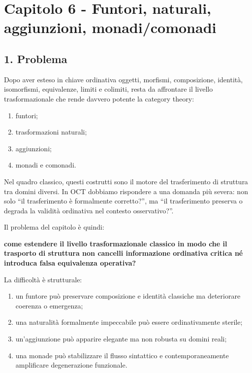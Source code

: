 \chapter{Capitolo 6 - Funtori, naturali, aggiunzioni, monadi/comonadi}

\section{1. Problema}

Dopo aver esteso in chiave ordinativa oggetti, morfismi, composizione, identità, isomorfismi, equivalenze, limiti e colimiti, resta da affrontare il livello trasformazionale che rende davvero potente la category theory:

\begin{enumerate}
\def\labelenumi{\arabic{enumi}.}
\tightlist
\item
  funtori;
\item
  trasformazioni naturali;
\item
  aggiunzioni;
\item
  monadi e comonadi.
\end{enumerate}

Nel quadro classico, questi costrutti sono il motore del trasferimento di struttura tra domini diversi. In OCT dobbiamo rispondere a una domanda più severa: non solo ``il trasferimento è formalmente corretto?'', ma ``il trasferimento preserva o degrada la validità ordinativa nel contesto osservativo?''.

Il problema del capitolo è quindi:

\textbf{come estendere il livello trasformazionale classico in modo che il trasporto di struttura non cancelli informazione ordinativa critica né introduca falsa equivalenza operativa?}

La difficoltà è strutturale:

\begin{enumerate}
\def\labelenumi{\arabic{enumi}.}
\tightlist
\item
  un funtore può preservare composizione e identità classiche ma deteriorare coerenza o emergenza;
\item
  una naturalità formalmente impeccabile può essere ordinativamente sterile;
\item
  un'aggiunzione può apparire elegante ma non robusta su domini reali;
\item
  una monade può stabilizzare il flusso sintattico e contemporaneamente amplificare degenerazione funzionale.
\end{enumerate}

